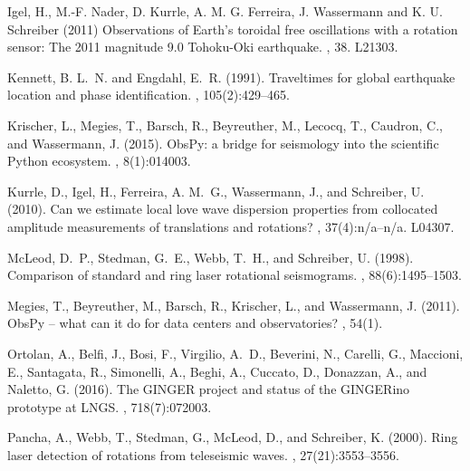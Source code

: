 \documentclass[12pt,reqno,letter]{article}
\begin{document}
\begin{thebibliography}{}
Igel, H., M.-F. Nader, D. Kurrle, A. M. G. Ferreira, J. Wassermann and K. U. Schreiber (2011)
\newblock Observations of Earth's toroidal free oscillations with a rotation sensor: The 2011 magnitude 9.0 Tohoku-Oki earthquake.
, 38.
\newblock L21303.

Kennett, B. L.~N. and Engdahl, E.~R. (1991).
\newblock Traveltimes for global earthquake location and phase identification.
, 105(2):429--465.

Krischer, L., Megies, T., Barsch, R., Beyreuther, M., Lecocq, T., Caudron, C.,
  and Wassermann, J. (2015).
\newblock Obs{P}y: a bridge for seismology into the scientific {P}ython ecosystem.
, 8(1):014003.

Kurrle, D., Igel, H., Ferreira, A. M.~G., Wassermann, J., and Schreiber, U.
  (2010).
\newblock Can we estimate local love wave dispersion properties from collocated
  amplitude measurements of translations and rotations?
, 37(4):n/a--n/a.
\newblock L04307.

McLeod, D.~P., Stedman, G.~E., Webb, T.~H., and Schreiber, U. (1998).
\newblock Comparison of standard and ring laser rotational seismograms.
,
  88(6):1495--1503.

Megies, T., Beyreuther, M., Barsch, R., Krischer, L., and Wassermann, J.
  (2011).
\newblock Obs{P}y – what can it do for data centers and observatories?
, 54(1).

Ortolan, A., Belfi, J., Bosi, F., Virgilio, A.~D., Beverini, N., Carelli, G.,
  Maccioni, E., Santagata, R., Simonelli, A., Beghi, A., Cuccato, D., Donazzan,
  A., and Naletto, G. (2016).
\newblock The {GINGER} project and status of the {GINGER}ino prototype at {LNGS}.
, 718(7):072003.

Pancha, A., Webb, T., Stedman, G., McLeod, D., and Schreiber, K. (2000).
\newblock Ring laser detection of rotations from teleseismic waves.
, 27(21):3553--3556.


\end{thebibliography}
\end{document}
